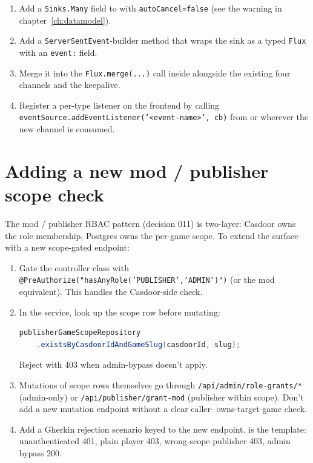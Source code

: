 \begin{enumerate}
  \item Add a \texttt{Sinks.Many} field to 
        with \texttt{autoCancel=false} (see the warning in
        chapter~\ref{ch:datamodel}).
  \item Add a \texttt{ServerSentEvent}-builder method that wraps the
        sink as a typed \texttt{Flux} with an \texttt{event:} field.
  \item Merge it into the \texttt{Flux.merge(...)} call inside
         alongside the existing four
        channels and the keepalive.
  \item Register a per-type listener on the frontend by calling
        \texttt{eventSource.addEventListener('<event-name>', cb)} from
         or wherever the new channel is
        consumed.
\end{enumerate}

\section{Adding a new mod / publisher scope check}

The mod / publisher RBAC pattern (decision 011) is two-layer: Casdoor
owns the role membership, Postgres owns the per-game scope. To extend
the surface with a new scope-gated endpoint:

\begin{enumerate}
  \item Gate the controller class with
        \texttt{@PreAuthorize("hasAnyRole('PUBLISHER','ADMIN')")} (or
        the mod equivalent). This handles the Casdoor-side check.
  \item In the service, look up the scope row before mutating:
\begin{lstlisting}[language=Java,xleftmargin=4mm]
publisherGameScopeRepository
    .existsByCasdoorIdAndGameSlug(casdoorId, slug);
\end{lstlisting}
        Reject with 403 when admin-bypass doesn't apply.
  \item Mutations of scope rows themselves go through
        \texttt{/api/admin/role-grants/*} (admin-only) or
        \texttt{/api/publisher/grant-mod} (publisher within scope).
        Don't add a new mutation endpoint without a clear caller-
        owns-target-game check.
  \item Add a Gherkin rejection scenario keyed to the new endpoint.
         is
        the template: unauthenticated 401, plain player 403,
        wrong-scope publisher 403, admin bypass 200.
\end{enumerate}

